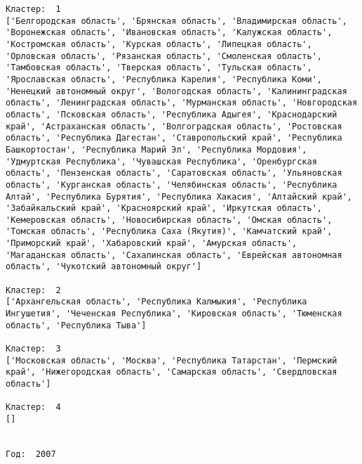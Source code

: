 \documentclass[11pt]{article}
\begin{document}
\begin{Verbatim}[commandchars=\\\{\}]
Кластер:  1
['Белгородская область', 'Брянская область', 'Владимирская область', 'Воронежская область', 'Ивановская область', 'Калужская область', 'Костромская область', 'Курская область', 'Липецкая область', 'Орловская область', 'Рязанская область', 'Смоленская область', 'Тамбовская область', 'Тверская область', 'Тульская область', 'Ярославская область', 'Республика Карелия', 'Республика Коми', 'Ненецкий автономный округ', 'Вологодская область', 'Калинингpадская область', 'Ленинградская область', 'Мурманская область', 'Новгородская область', 'Псковская область', 'Республика Адыгея', 'Краснодарский край', 'Астраханская область', 'Волгоградская область', 'Ростовская область', 'Республика Дагестан', 'Ставропольский край', 'Республика Башкортостан', 'Республика Марий Эл', 'Республика Мордовия', 'Удмуртская Республика', 'Чувашская Республика', 'Оренбургская область', 'Пензенская область', 'Саратовская область', 'Ульяновская область', 'Курганская область', 'Челябинская область', 'Республика Алтай', 'Республика Бурятия', 'Республика Хакасия', 'Алтайский край', 'Забайкальский край', 'Красноярский край', 'Иркутская область', 'Кемеровская область', 'Новосибирская область', 'Омская область', 'Томская область', 'Республика Саха (Якутия)', 'Камчатский край', 'Приморский край', 'Хабаровский край', 'Амурская область', 'Магаданская область', 'Сахалинская область', 'Еврейская автономная область', 'Чукотский автономный округ']

Кластер:  2
['Архангельская область', 'Республика Калмыкия', 'Республика Ингушетия', 'Чеченская Республика', 'Кировская область', 'Тюменская область', 'Республика Тыва']

Кластер:  3
['Московская область', 'Москва', 'Республика Татарстан', 'Пермский край', 'Нижегородская область', 'Самарская область', 'Свердловская область']

Кластер:  4
[]


Год:  2007


\end{Verbatim}
\end{document}
